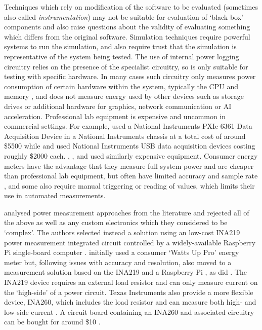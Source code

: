 Techniques which rely on modification of the software to be evaluated (sometimes also called \emph{instrumentation}) may not be suitable for evaluation of `black box' components and also raise questions about the validity of evaluating something which differs from the original software. Simulation techniques require powerful systems to run the simulation, and also require trust that the simulation is representative of the system being tested. The use of internal power logging circuitry relies on the presence of the specialist circuitry, so is only suitable for testing with specific hardware. In many cases such circuitry only measures power consumption of certain hardware within the system, typically the CPU and memory \citep{IntelCorporation2019}, and does not measure energy used by other devices such as storage drives or additional hardware for graphics, network communication or AI acceleration. Professional lab equipment is expensive and uncommon in commercial settings. For example, \citet{Dzhagaryan2016} used a National Instruments PXIe-6361 Data Acquisition Device in a National Instruments chassis at a total cost of around \$5500 while \citet{Manotas2014} and \citet{Ardito2018} used National Instruments USB data acquisition devices costing roughly \$2000 each. \citet{Rice2010}, \citet{Povoa2013}, and \citet{Milosevic2013} used similarly expensive equipment. Consumer energy meters have the advantage that they measure full system power and are cheaper than professional lab equipment, but often have limited accuracy and sample rate  \citep{Hindle2012a}, and some also require manual triggering or reading of values, which limits their use in automated measurements.

\citet{Dezfouli2018} analysed power measurement approaches from the literature and rejected all of the above as well as any custom electronics which they considered to be `complex'. The authors selected instead a solution using an low-cost INA219 power measurement integrated circuit \citep{TexasInstruments2015} controlled by a widely-available Raspberry Pi single-board computer \citep{RaspberryPi}. \citet{Hindle2012} initially used a consumer `Watts Up Pro' energy meter but, following issues with accuracy and resolution, also moved to a measurement solution based on the INA219 and a Raspberry Pi \citep{Hindle2014}, as did \citet{Chowdhury2015}. The INA219 device requires an external load resistor and can only measure current on the `high-side' of a power circuit. Texas Instruments also provide a more flexible device, INA260, which includes the load resistor and can measure both high- and low-side current \citep{TexasInstruments2016}. A circuit board containing an INA260 and associated circuitry can be bought for around \$10 \citep{AdafruitINA260}.

